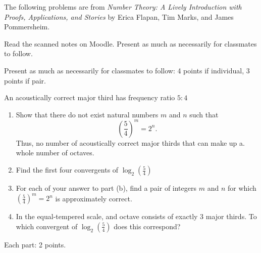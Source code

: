 \documentclass[letterpaper, 11 pt,handout,hints]{ximera}
\begin{document}
\begin{exploration}
The following problems are from \emph{Number Theory: A Lively Introduction with Proofs, Applications, and Stories} by Erica Flapan, Tim Marks, and James Pommersheim.

	Read the scanned notes on Moodle. Present as much as necessarily for classmates to follow.
	
\begin{rubric}
 Present as much as necessarily for classmates to follow: 4 points if individual, 3 points if pair.
\end{rubric}

\begin{problem}
	An acoustically correct major third has frequency ratio $5:4$ 
	\begin{enumerate}
 		\item Show that there do not exist natural numbers $m$ and $n$ such that \[\left(\frac{5}{4}\right)^m=2^n.\]
		Thus, no number of acoustically correct major thirds that can make up a. whole number of octaves. 
		\item Find the first four convergents of $\log_2\left(\frac{5}{4}\right)$
		\item For each of your answer to part (b), find a pair of integers $m$ and $n$ for which $\left(\frac{5}{4}\right)^m=2^n$ is approximately correct.
		\item In the equal-tempered scale, and octave consists of exactly 3 major thirds. To which convergent of $\log_2\left(\frac{5}{4}\right)$ does this correspond?

	\end{enumerate}
\begin{rubric}
Each part: 2 points.
\end{rubric}
\end{problem}
\end{exploration}
\end{document}
